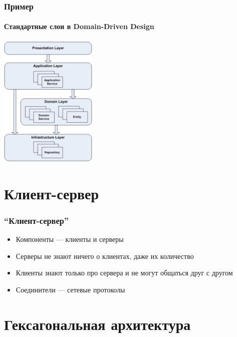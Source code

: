 \documentclass{../../slides-style}
\begin{document}
    \begin{frame}
        \frametitle{Пример}
        \framesubtitle{Стандартные слои в Domain-Driven Design}
        \begin{center}
            \includegraphics[width=0.35\textwidth]{dddLayers.png}
            \begin{scriptsize}
            \end{scriptsize}
        \end{center}
    \end{frame}

    \section{Клиент-сервер}

    \begin{frame}
        \frametitle{``Клиент-сервер''}
        \begin{itemize}
            \item Компоненты --- клиенты и серверы
            \item Серверы не знают ничего о клиентах, даже их количество
            \item Клиенты знают только про сервера и не могут общаться друг с другом
            \item Соединители --- сетевые протоколы
        \end{itemize}
    \end{frame}

    \section{Гексагональная архитектура}
\end{document}
